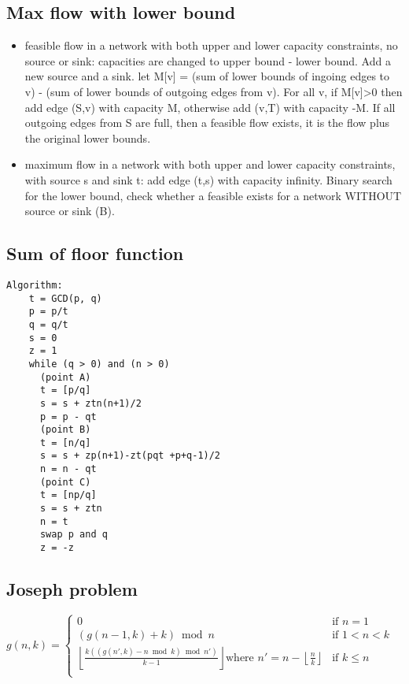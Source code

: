 \subsection{Max flow with lower bound}
\begin{itemize}
\item feasible flow in a network with both upper and lower capacity constraints, no source or sink: capacities are changed to upper bound - lower bound. Add a new source and a sink. let M[v] = (sum of lower bounds of ingoing edges to v) - (sum of lower bounds of outgoing edges from v). For all v, if M[v]>0 then add edge (S,v) with capacity M, otherwise add (v,T) with capacity -M. If all outgoing edges from S are full, then a feasible flow exists, it is the flow plus the original lower bounds.
\item maximum flow in a network with both upper and lower capacity constraints, with source s and sink t: add edge (t,s) with capacity infinity. Binary search for the lower bound, check whether a feasible exists for a network WITHOUT source or sink (B).
\end{itemize}
\hrulefill
\subsection{Sum of floor function}
\raggedbottom\begin{lstlisting}[style=txt]
Algorithm:
    t = GCD(p, q)
    p = p/t
    q = q/t
    s = 0
    z = 1
    while (q > 0) and (n > 0)
      (point A)
      t = [p/q]
      s = s + ztn(n+1)/2
      p = p - qt
      (point B)
      t = [n/q]
      s = s + zp(n+1)-zt(pqt +p+q-1)/2
      n = n - qt
      (point C)
      t = [np/q]
      s = s + ztn
      n = t
      swap p and q
      z = -z
\end{lstlisting}
\hrulefill
\subsection{Joseph problem}
${\displaystyle g(n,k)={\begin{cases}
 0 & {\text{if }}n=1\\
 (g(n-1,k)+k){\bmod {n}}&{\text{if }} 1<n<k\\
 \left\lfloor {\frac {k((g(n',k)-n{\bmod {k}}){\bmod {n}}')}{k-1}}\right\rfloor {\text{where }}n'=n-\left\lfloor {\frac {n}{k}}\right\rfloor &{\text{if }}k\leq n\\
 \end{cases}}}$\\
\hrulefill